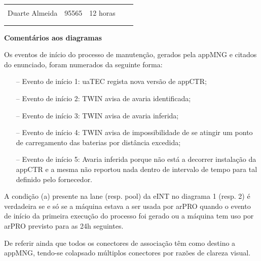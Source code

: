 \documentclass{article}
\begin{document}
\begin{table}[H]
\begin{tabular}{|l|l|l|l|l}
        \multicolumn{1}{|l|}{}                   & \multicolumn{1}{l|}{}       & \multicolumn{1}{l|}{}                             & \multicolumn{1}{l|}{}                   &  \\
        \multicolumn{1}{|c|}{Duarte Almeida}     & \multicolumn{1}{c|}{95565}  & \multicolumn{1}{c|}{12 horas}                     & \multicolumn{1}{l|}{}                   &  \\
        \multicolumn{1}{|l|}{}                   & \multicolumn{1}{l|}{}       & \multicolumn{1}{l|}{}                             & \multicolumn{1}{l|}{}                   &  \\
        \multicolumn{1}{|l|}{}                   & \multicolumn{1}{l|}{}       & \multicolumn{1}{l|}{}                             & \multicolumn{1}{l|}{}                   &  \\ \cline{1-4}
        \end{tabular}
        \end{table}

    \vspace{0.3cm}

    \noindent \large \textbf{Comentários aos diagramas}

    \vspace{0.5em} \normalsize
    Os eventos de início do processo de manutenção, gerados pela appMNG e citados do enunciado, foram numerados da seguinte forma:
    \vspace{-0.1em}
    \begin{itemize}
        \itemsep0em 
        \item[--] Evento de início 1: uaTEC regista nova versão de appCTR;
        \item[--] Evento de início 2: TWIN avisa de avaria identificada;
        \item[--] Evento de início 3: TWIN avisa de avaria inferida;
        \item[--] Evento de início 4: TWIN avisa de impossibilidade de se atingir um ponto de carregamento das baterias por distância excedida;
        \item[--] Evento de início 5: Avaria inferida porque não está a decorrer instalação da appCTR e a mesma não reportou nada dentro de intervalo de tempo para tal definido pelo fornecedor. 
    \end{itemize} \par
    \vspace{-0.1em}
    A condição (a) presente na lane (resp. pool) da eINT no diagrama 1 (resp. 2) é verdadeira se e só se a máquina estava a ser usada por arPRO quando o evento
    de início da primeira execução do processo foi gerado ou a máquina tem uso por arPRO previsto para as 24h seguintes. \par
    De referir ainda que todos os conectores de associação têm como destino a appMNG, tendo-se colapsado múltiplos conectores por razões de clareza visual.
    \pagebreak
\end{document}
